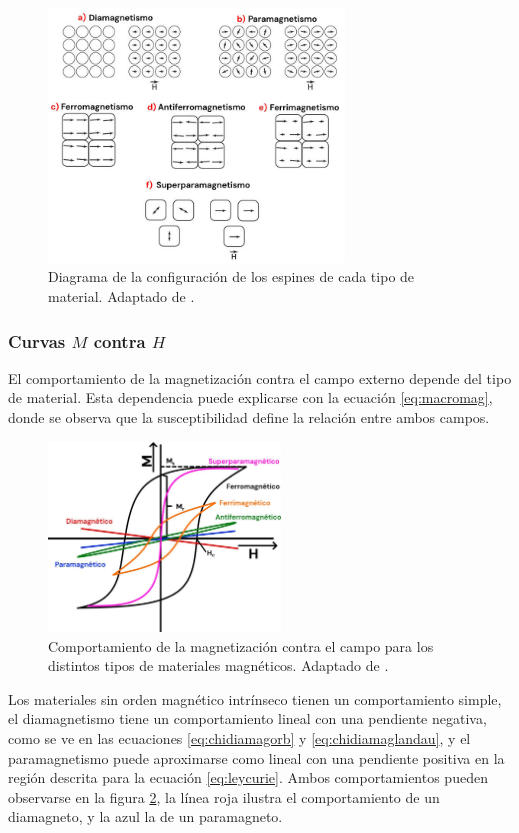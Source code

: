 \documentclass[../main.tex]{subfiles}
\begin{document}
\begin{figure}[H]
    \centering
    \includegraphics[width=0.7\textwidth]{fig/magtiposdiag.jpg}
    \caption{Diagrama de la configuración de los espines de cada tipo de material. Adaptado de \cite{Bloemen2015}.}
    \label{fig:magtiposdiag}
\end{figure}
\subsubsection{Curvas \texorpdfstring{$M$}{M} contra \texorpdfstring{$H$}{H}}
El comportamiento de la magnetización contra el campo externo depende del tipo de material. Esta dependencia puede explicarse con la ecuación \ref{eq:macromag}, donde se observa que la susceptibilidad define la relación entre ambos campos.
\begin{figure}[H]
    \centering
    \includegraphics[width=0.55\textwidth]{fig/histeresis1.jpg}
    \caption{Comportamiento de la magnetización contra el campo para los distintos tipos de materiales magnéticos. Adaptado de \cite{Buschow2003}.}
    \label{fig:campomag}
\end{figure}
Los materiales sin orden magnético intrínseco tienen un comportamiento simple, el diamagnetismo tiene un comportamiento lineal con una pendiente negativa, como se ve en las ecuaciones \ref{eq:chidiamagorb} y \ref{eq:chidiamaglandau}, y el paramagnetismo puede aproximarse como lineal con una pendiente positiva en la región descrita para la ecuación \ref{eq:leycurie}. Ambos comportamientos pueden observarse en la figura \ref{fig:campomag}, la línea roja ilustra el comportamiento de un diamagneto, y la azul la de un paramagneto.
\end{document}
